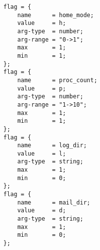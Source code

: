 \begin{verbatim}
flag = {
    name      = home_mode;          
    value     = h;                  
    arg-type  = number;
    arg-range = "0->1";
    max       = 1;                  
    min       = 1;                  
};
flag = {
    name      = proc_count;         
    value     = p;                  
    arg-type  = number;
    arg-range = "1->10";
    max       = 1;                  
    min       = 1;                  
};
flag = {
    name      = log_dir;            
    value     = l;                  
    arg-type  = string;
    max       = 1;                  
    min       = 0;                  
};
flag = {
    name      = mail_dir;           
    value     = d;                  
    arg-type  = string;
    max       = 1;                  
    min       = 0;                  
};
\end{verbatim}

